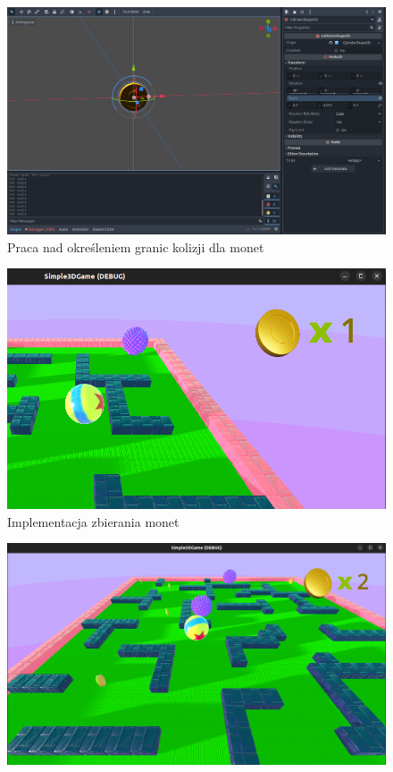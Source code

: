 \documentclass[a4paper]{article}
\begin{document}
\begin{sloppypar}
\begin{center}
		\begin{figure}[htb]
			\centering
			\includegraphics[width=1\textwidth]{3d/coin-collision.png}
			\caption{Praca nad określeniem granic kolizji dla monet}
		\end{figure}
		\begin{figure}[htb]
			\centering
			\includegraphics[width=1\textwidth]{3d/coin1_collected.png}
			\caption{Implementacja zbierania monet}
		\end{figure}
		\begin{figure}[htb]
			\centering
			\includegraphics[width=1\textwidth]{3d/complete1.png}

\end{figure}
\end{center}
\end{sloppypar}
\end{document}
